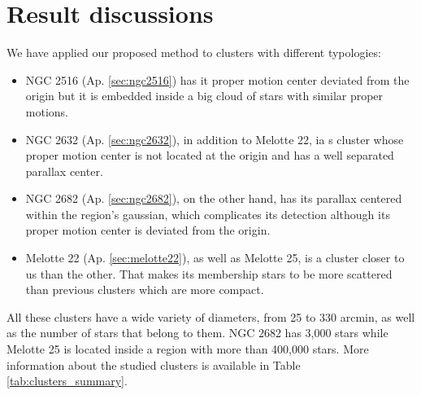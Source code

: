 \documentclass[11pt,a4paper,english,twocolumn]{article}
\begin{document}
\section{Result discussions}

We have applied our proposed method to clusters with different typologies:

\begin{itemize}
  \item NGC 2516 (Ap. \ref{sec:ngc2516}) has it proper motion center deviated from the origin but
        it is embedded inside a big cloud of stars with similar proper motions.
  \item NGC 2632 (Ap. \ref{sec:ngc2632}), in addition to Melotte 22, ia s cluster whose proper motion center
        is not located at the origin and has a well separated parallax center.
  \item NGC 2682 (Ap. \ref{sec:ngc2682}), on the other hand, has its parallax centered within the region's gaussian,
        which complicates its detection although its proper motion center is deviated from the origin.
  \item Melotte 22 (Ap. \ref{sec:melotte22}), as well as Melotte 25, is a cluster closer to us than the other.
        That makes its membership stars to be more scattered than previous clusters which are more compact.
\end{itemize}

All these clusters have a wide variety of diameters, from 25 to 330 arcmin,
as well as the number of stars that belong to them. NGC 2682 has 3,000 stars
while Melotte 25 is located inside a region with more than 400,000 stars.
More information about the studied clusters is available in Table \ref{tab:clusters_summary}.

\begin{table}[htbp]
  \begin{center}
    \caption{Righ ascension, declination, radius and number of stars of studied clusters.
             The number of stars corresponds to those stars contained within a cone of center
             $(\alpha, \delta)$ and raius the cluster's radius multiplied by a factor of 1.5.}
    \label{tab:clusters_summary}
  \end{center}
\end{table}
\end{document}
